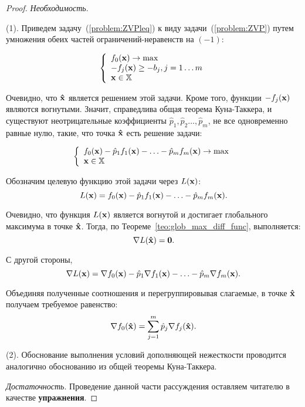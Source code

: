 \begin{proof} \emph{Необходимость}.

(1). Приведем задачу~(\ref{problem:ZVPleq}) к виду
задачи~(\ref{problem:ZVP}) путем умножения обеих частей
ограничений-неравенств на $(-1)$:

\begin{equation}
\left\{ \begin{array}{l}
 f_0(\mathbf{x}) \to \max  \\
 -f_j (\mathbf{x}) \geq -b_j, j = 1 \ldots m\\
 \mathbf{x} \in \mathbb{X} \\
 \end{array} \right.
\end{equation}


Очевидно, что $\mathbf{\hat x}$ является решением этой задачи. Кроме
того, функции $-f_j (\mathbf{x})$ являются вогнутыми. Значит,
справедлива общая теорема Куна-Таккера, и существуют неотрицательные
коэффициенты $\hat p_1, \hat p_2 \ldots, \hat p_m$, не все
одновременно равные нулю, такие, что точка $\mathbf{\hat x}$ есть
решение задачи:

\[
\left\{ \begin{array}{l}
 f_0(\mathbf{x}) - \hat p_1 f_1(\mathbf{x})- \ldots - \hat p_m f_m(\mathbf{x}) \to \max  \\
 \mathbf{x} \in \mathbb{X} \\
 \end{array} \right.
\]

Обозначим целевую функцию этой задачи через $L(\mathbf{x})$:
\[
L(\mathbf{x})= f_0(\mathbf{x}) - \hat p_1 f_1(\mathbf{x})- \ldots - \hat p_m
f_m(\mathbf{x}).
\]

Очевидно, что функция $L(\mathbf{x})$ является вогнутой и достигает
глобального максимума в точке $\mathbf{\hat x}$. Тогда, по
Теореме~\ref{teo:glob_max_diff_func}, выполняется:
\[
\nabla L(\mathbf{\hat x})=\mathbf{0}.
\]

С другой стороны,
\[
\nabla L(\mathbf{x})= \nabla f_0(\mathbf{x}) - \hat p_1 \nabla f_1(\mathbf{x})-
\ldots - \hat p_m \nabla f_m(\mathbf{x}).
\]

Объединяя полученные соотношения и перегруппировывая слагаемые, в
точке $\mathbf{\hat x}$ получаем требуемое равенство:
\[
\nabla f_0(\mathbf{\hat x})=  \sum_{j=1}^{m} \hat p_j \nabla
f_j(\mathbf{\hat x}).
\]


(2). Обоснование выполнения условий дополняющей нежесткости
проводится аналогично обоснованию из общей теоремы Куна-Таккера.

\emph{Достаточность}. Проведение данной части рассуждения оставляем
читателю в качестве \textbf{упражнения}.


\end{proof}












